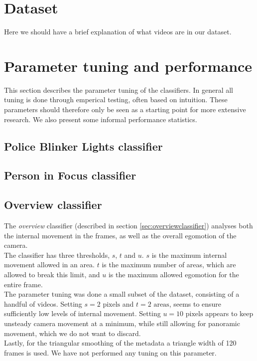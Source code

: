 \section{Dataset}
%
Here we should have a brief explanation of what videos are in our dataset.
%
\section{Parameter tuning and performance}
%
This section describes the parameter tuning of the classifiers. In general all tuning is done through emperical testing, often based on intuition. These parameters should therefore only be seen as a starting point for more extensive research. We also present some informal performance statistics.
%
\subsection{Police Blinker Lights classifier}
\subsection{Person in Focus classifier}
\subsection{Overview classifier}
%
The \textit{overview} classifier (described in section \ref{sec:overviewclassifier}) analyses both the internal movement in the frames, as well as the overall egomotion of the camera.\\
The classifier has three thresholds, $s$, $t$ and $u$. $s$ is the maximum internal movement allowed in an area. $t$ is the maximum number of areas, which are allowed to break this limit, and $u$ is the maximum allowed egomotion for the entire frame.\\
The parameter tuning was done a small subset of the dataset, consisting of a handful of videos. Setting $s = 2 \text{ pixels}$ and $t = 2 \text{ areas}$, seems to ensure sufficiently low levels of internal movement. Setting $u = 10 \text{ pixels}$ appears to keep unsteady camera movement at a minimum, while still allowing for panoramic movement, which we do not want to discard.\\
Lastly, for the triangular smoothing of the metadata a triangle width of 120 frames is used. We have not performed any tuning on this parameter.
%
